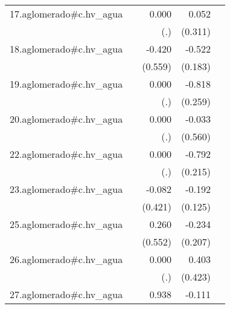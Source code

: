 {\begin{longtable}{l*{4}{D{.}{.}{-1}}}
\addlinespace
17.aglomerado#c.hv\_agua&                     &       0.000         &       0.052         &                     \\
            &                     &         (.)         &     (0.311)         &                     \\
\addlinespace
18.aglomerado#c.hv\_agua&                     &      -0.420         &      -0.522\sym{**} &                     \\
            &                     &     (0.559)         &     (0.183)         &                     \\
\addlinespace
19.aglomerado#c.hv\_agua&                     &       0.000         &      -0.818\sym{**} &                     \\
            &                     &         (.)         &     (0.259)         &                     \\
\addlinespace
20.aglomerado#c.hv\_agua&                     &       0.000         &      -0.033         &                     \\
            &                     &         (.)         &     (0.560)         &                     \\
\addlinespace
22.aglomerado#c.hv\_agua&                     &       0.000         &      -0.792\sym{***}&                     \\
            &                     &         (.)         &     (0.215)         &                     \\
\addlinespace
23.aglomerado#c.hv\_agua&                     &      -0.082         &      -0.192         &                     \\
            &                     &     (0.421)         &     (0.125)         &                     \\
\addlinespace
25.aglomerado#c.hv\_agua&                     &       0.260         &      -0.234         &                     \\
            &                     &     (0.552)         &     (0.207)         &                     \\
\addlinespace
26.aglomerado#c.hv\_agua&                     &       0.000         &       0.403         &                     \\
            &                     &         (.)         &     (0.423)         &                     \\
\addlinespace
27.aglomerado#c.hv\_agua&                     &       0.938         &      -0.111         &                     \\

\end{longtable}}
